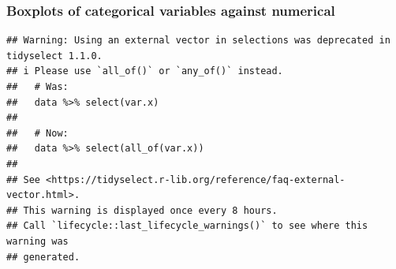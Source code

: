 \documentclass[
]{article}
\begin{document}
\hypertarget{boxplots-of-categorical-variables-against-numerical}{%
\subsubsection{Boxplots of categorical variables against
numerical}\label{boxplots-of-categorical-variables-against-numerical}}

\begin{verbatim}
## Warning: Using an external vector in selections was deprecated in tidyselect 1.1.0.
## i Please use `all_of()` or `any_of()` instead.
##   # Was:
##   data %>% select(var.x)
## 
##   # Now:
##   data %>% select(all_of(var.x))
## 
## See <https://tidyselect.r-lib.org/reference/faq-external-vector.html>.
## This warning is displayed once every 8 hours.
## Call `lifecycle::last_lifecycle_warnings()` to see where this warning was
## generated.
\end{verbatim}
\end{document}
